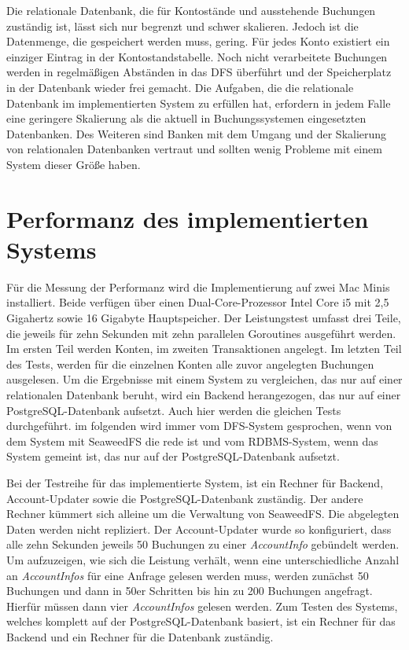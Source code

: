 \documentclass[12pt,oneside,a4paper,parskip]{scrbook}
\begin{document}
Die relationale Datenbank, die für Kontostände und ausstehende Buchungen zuständig ist, lässt sich nur begrenzt und schwer skalieren. Jedoch ist die Datenmenge, die gespeichert werden muss, gering. Für jedes Konto existiert ein einziger Eintrag in der Kontostandstabelle. Noch nicht verarbeitete Buchungen werden in regelmäßigen Abständen in das DFS überführt und der Speicherplatz in der Datenbank wieder frei gemacht. Die Aufgaben, die die relationale Datenbank im implementierten System zu erfüllen hat, erfordern in jedem Falle eine geringere Skalierung als die aktuell in Buchungssystemen eingesetzten Datenbanken. Des Weiteren sind Banken mit dem Umgang und der Skalierung von relationalen Datenbanken vertraut und sollten wenig Probleme mit einem System dieser Größe haben.


\section{Performanz des implementierten Systems}
Für die Messung der Performanz wird die Implementierung auf zwei Mac Minis installiert. Beide verfügen über einen Dual-Core-Prozessor Intel Core i5 mit 2,5 Gigahertz sowie 16 Gigabyte Hauptspeicher.
Der Leistungstest umfasst drei Teile, die jeweils für zehn Sekunden mit zehn parallelen Goroutines ausgeführt werden. Im ersten Teil werden Konten, im zweiten Transaktionen angelegt. Im letzten Teil des Tests, werden für die einzelnen Konten alle zuvor angelegten Buchungen ausgelesen. Um die Ergebnisse mit einem System zu vergleichen, das nur auf einer relationalen Datenbank beruht, wird ein Backend herangezogen, das nur auf einer PostgreSQL-Datenbank aufsetzt. Auch hier werden die gleichen Tests durchgeführt. im folgenden wird immer vom DFS-System gesprochen, wenn von dem System mit SeaweedFS die rede ist und vom RDBMS-System, wenn das System gemeint ist, das nur auf der PostgreSQL-Datenbank aufsetzt.

Bei der Testreihe für das implementierte System, ist ein Rechner für Backend, Account-Updater sowie die PostgreSQL-Datenbank zuständig.
Der andere Rechner kümmert sich alleine um die Verwaltung von SeaweedFS. Die abgelegten Daten werden nicht repliziert. Der Account-Updater wurde so konfiguriert, dass alle zehn Sekunden jeweils 50 Buchungen zu einer \textit{AccountInfo} gebündelt werden. Um aufzuzeigen, wie sich die Leistung verhält, wenn eine unterschiedliche Anzahl an \textit{AccountInfos} für eine Anfrage gelesen werden muss, werden zunächst 50 Buchungen und dann in 50er Schritten bis hin zu 200 Buchungen angefragt. Hierfür müssen dann vier \textit{AccountInfos} gelesen werden. 
Zum Testen des Systems, welches komplett auf der PostgreSQL-Datenbank basiert, ist ein Rechner für das Backend und ein Rechner für die Datenbank zuständig.
\end{document}
